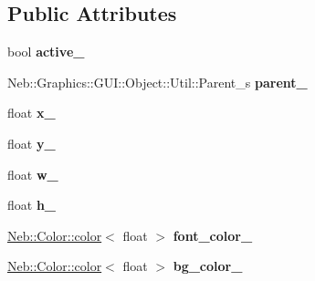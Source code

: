 \subsection*{\-Public \-Attributes}
\begin{DoxyCompactItemize}
\item 
\hypertarget{classNeb_1_1Graphics_1_1GUI_1_1Object_1_1Base_aa83c30c9ddec63903eabe3b8fa153524}{bool {\bfseries active\-\_\-}}\label{classNeb_1_1Graphics_1_1GUI_1_1Object_1_1Base_aa83c30c9ddec63903eabe3b8fa153524}

\item 
\hypertarget{classNeb_1_1Graphics_1_1GUI_1_1Object_1_1Base_ab7ab49ee13c9498d582a9965f95f4c99}{\-Neb\-::\-Graphics\-::\-G\-U\-I\-::\-Object\-::\-Util\-::\-Parent\-\_\-s {\bfseries parent\-\_\-}}\label{classNeb_1_1Graphics_1_1GUI_1_1Object_1_1Base_ab7ab49ee13c9498d582a9965f95f4c99}

\item 
\hypertarget{classNeb_1_1Graphics_1_1GUI_1_1Object_1_1Base_ac2b120b5b76e71933e6c7554086b5372}{float {\bfseries x\-\_\-}}\label{classNeb_1_1Graphics_1_1GUI_1_1Object_1_1Base_ac2b120b5b76e71933e6c7554086b5372}

\item 
\hypertarget{classNeb_1_1Graphics_1_1GUI_1_1Object_1_1Base_a1c086f7f9315d76227dd698558b25892}{float {\bfseries y\-\_\-}}\label{classNeb_1_1Graphics_1_1GUI_1_1Object_1_1Base_a1c086f7f9315d76227dd698558b25892}

\item 
\hypertarget{classNeb_1_1Graphics_1_1GUI_1_1Object_1_1Base_ab7bf6724232c46716f20a0b4ec68aaf2}{float {\bfseries w\-\_\-}}\label{classNeb_1_1Graphics_1_1GUI_1_1Object_1_1Base_ab7bf6724232c46716f20a0b4ec68aaf2}

\item 
\hypertarget{classNeb_1_1Graphics_1_1GUI_1_1Object_1_1Base_a42511ee84faa072da3e7e2be06227936}{float {\bfseries h\-\_\-}}\label{classNeb_1_1Graphics_1_1GUI_1_1Object_1_1Base_a42511ee84faa072da3e7e2be06227936}

\item 
\hypertarget{classNeb_1_1Graphics_1_1GUI_1_1Object_1_1Base_a9129f69e5646bfb0092bbe79d4df2796}{\hyperlink{classNeb_1_1Color_1_1color}{\-Neb\-::\-Color\-::color}$<$ float $>$ {\bfseries font\-\_\-color\-\_\-}}\label{classNeb_1_1Graphics_1_1GUI_1_1Object_1_1Base_a9129f69e5646bfb0092bbe79d4df2796}

\item 
\hypertarget{classNeb_1_1Graphics_1_1GUI_1_1Object_1_1Base_a232731c6db95d94d1a92924ba3739e04}{\hyperlink{classNeb_1_1Color_1_1color}{\-Neb\-::\-Color\-::color}$<$ float $>$ {\bfseries bg\-\_\-color\-\_\-}}\label{classNeb_1_1Graphics_1_1GUI_1_1Object_1_1Base_a232731c6db95d94d1a92924ba3739e04}


\end{DoxyCompactItemize}
